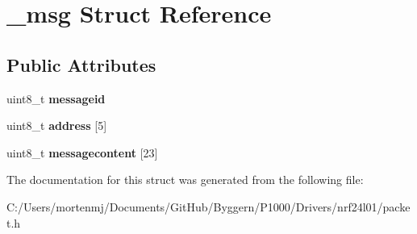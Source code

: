 \hypertarget{struct__msg}{\section{\-\_\-msg Struct Reference}
\label{struct__msg}
}
\subsection*{Public Attributes}
\begin{DoxyCompactItemize}
\item 
\hypertarget{struct__msg_a1ca12b5be9fa0f2536fc43aa1f015aee}{uint8\-\_\-t {\bfseries messageid}}\label{struct__msg_a1ca12b5be9fa0f2536fc43aa1f015aee}

\item 
\hypertarget{struct__msg_ade871535447328dc41f40da627bd3e22}{uint8\-\_\-t {\bfseries address} \mbox{[}5\mbox{]}}\label{struct__msg_ade871535447328dc41f40da627bd3e22}

\item 
\hypertarget{struct__msg_a8c16f1a0aea4a2e5a4f683f494f428a7}{uint8\-\_\-t {\bfseries messagecontent} \mbox{[}23\mbox{]}}\label{struct__msg_a8c16f1a0aea4a2e5a4f683f494f428a7}

\end{DoxyCompactItemize}


The documentation for this struct was generated from the following file\-:\begin{DoxyCompactItemize}
\item 
C\-:/\-Users/mortenmj/\-Documents/\-Git\-Hub/\-Byggern/\-P1000/\-Drivers/nrf24l01/packet.\-h\end{DoxyCompactItemize}
